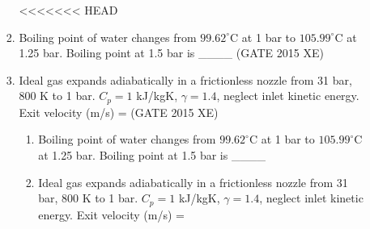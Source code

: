 \documentclass[journal,12pt,onecolumn]{IEEEtran}
\begin{document}
\begin{enumerate}
\begin{enumerate}
\begin{enumerate}
\begin{multicols}{4}
<<<<<<< HEAD
\end{multicols}

\item Boiling point of water changes from $99.62^\circ$C at 1 bar to $105.99^\circ$C at 1.25 bar. Boiling point at 1.5 bar is \_\_\_\_
\hfill{(GATE 2015 XE)} \\


\item Ideal gas expands adiabatically in a frictionless nozzle from 31 bar, 800 K to 1 bar. $C_p=1$ kJ/kgK, $\gamma=1.4$, neglect inlet kinetic energy. Exit velocity (m/s) =  
\hfill{(GATE 2015 XE)} \\
\begin{multicols}{4}
\begin{enumerate}
=======
\vspace{0.5cm}

\item Boiling point of water changes from $99.62^\circ$C at 1 bar to $105.99^\circ$C at 1.25 bar. Boiling point at 1.5 bar is \_\_\_\_
\hfill{} \\

\vspace{0.5cm}

\item Ideal gas expands adiabatically in a frictionless nozzle from 31 bar, 800 K to 1 bar. $C_p=1$ kJ/kgK, $\gamma=1.4$, neglect inlet kinetic energy. Exit velocity (m/s) =  
\hfill{} \\


\end{enumerate}
\end{multicols}
\end{enumerate}
\end{enumerate}
\end{enumerate}
\end{document}
